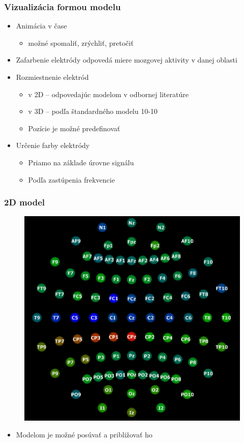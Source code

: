 \documentclass{beamer}
\begin{document}
\begin{frame}
	\frametitle{Vizualizácia formou modelu}
	\begin{itemize}
		\item Animácia v čase
		\begin{itemize}
			\item možné spomaliť, zrýchliť, pretočiť
		\end{itemize}
		\item Zafarbenie elektródy odpovedá miere mozgovej aktivity v danej oblasti
		\item Rozmiestnenie elektród
		\begin{itemize}
			\item v 2D -- odpovedajúc modelom v odbornej literatúre
			\item v 3D -- podľa štandardného modelu 10-10
			\item Pozície je možné predefinovať
		\end{itemize}
		\item Určenie farby elektródy
		\begin{itemize}
			\item Priamo na základe úrovne signálu
			\item Podľa zastúpenia frekvencie
		\end{itemize}
	\end{itemize}
\end{frame}

\begin{frame}
	\frametitle{2D model}
	\begin{figure}
		\centering
		\includegraphics[height=0.7\textheight]{2d.png}
	\end{figure}
	\begin{itemize}
		\item Modelom je možné posúvať a približovať ho
	\end{itemize}
\end{frame}
\end{document}
